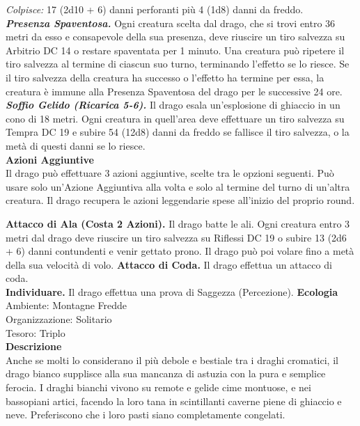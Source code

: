 \begin{multicols}{2}
\emph{Colpisce:} 17 (2d10 + 6) danni perforanti più 4 (1d8) danni da freddo.\\
\emph{\textbf{Presenza Spaventosa.}} Ogni creatura scelta dal drago, che si trovi entro 36 metri da esso e consapevole della sua presenza, deve riuscire un tiro salvezza su Arbitrio DC 14 o restare spaventata per 1 minuto. Una creatura può ripetere il tiro salvezza al termine di ciascun suo turno, terminando l'effetto se lo riesce. Se il tiro salvezza della creatura ha successo o l'effetto ha termine per essa, la creatura è immune alla Presenza Spaventosa del drago per le successive 24 ore.\\
\emph{\textbf{Soffio Gelido (Ricarica 5-6).}} Il drago esala un'esplosione di ghiaccio in un cono di 18 metri. Ogni creatura in quell'area deve effettuare un tiro salvezza su Tempra DC 19 e subire 54 (12d8) danni da freddo se fallisce il tiro salvezza, o la metà di questi danni se lo riesce.\\
\textbf{Azioni Aggiuntive} \\
Il drago può effettuare 3 azioni aggiuntive, scelte tra le opzioni seguenti. Può usare solo un'Azione Aggiuntiva alla volta e solo al termine del turno di un'altra creatura. Il drago recupera le azioni leggendarie spese all'inizio del proprio round.

\textbf{Attacco di Ala (Costa 2 Azioni).} Il drago batte le ali. Ogni creatura entro 3 metri dal drago deve riuscire un tiro salvezza su Riflessi DC 19 o subire 13 (2d6 + 6) danni contundenti e venir gettato prono. Il drago può poi volare fino a metà della sua velocità di volo. \textbf{Attacco di Coda.} Il drago effettua un attacco di coda. \\
\textbf{Individuare.} Il drago effettua una prova di Saggezza (Percezione).
\textbf{Ecologia}\\
Ambiente: Montagne Fredde\\
Organizzazione: Solitario\\
Tesoro: Triplo\\
\textbf{Descrizione}\\
Anche se molti lo considerano il più debole e bestiale tra i draghi cromatici, il drago bianco supplisce alla sua mancanza di astuzia con la pura e semplice ferocia. I draghi bianchi vivono su remote e gelide cime montuose, e nei bassopiani artici, facendo la loro tana in scintillanti caverne piene di ghiaccio e neve. Preferiscono che i loro pasti siano completamente congelati.\\



\end{multicols}
